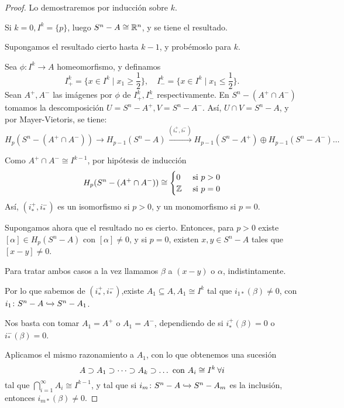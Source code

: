 \begin{proof}
  Lo demostraremos por inducción sobre $k$.

  Si $k = 0, I^k = \{p\}$, luego $S^n - A \cong \mathbb{R}^n$, y se tiene el resultado.

  Supongamos el resultado cierto hasta $k-1$, y probémoslo para $k$.

  Sea $\phi \colon I^k \to A$ homeomorfismo, y definamos
  \[ I_+^k = \{x \in I^k \mid x_1 \geq \frac{1}{2}\}, \quad I_-^k = \{x \in I^k \mid x_1 \leq \frac{1}{2}\}.\]
  Sean $A^+, A^-$ las imágenes por $\phi$ de $I_+^k, I_-^k$ respectivamente.
  En $S^n - (A^+ \cap A^-)$ tomamos la descomposición $U = S^n - A^+, V = S^n - A^-$. Así,
  $U \cap V = S^n - A$, y por Mayer-Vietoris, se tiene:
  \[ H_p(S^n - (A^+ \cap A^-)) \to H_{p-1}(S^n - A) \xrightarrow{(i_*^+, i_*^-)} H_{p-1}(S^n - A^+) \oplus H_{p-1}(S^n - A^-) \dots \]

  Como $A^+ \cap A^- \cong I^{k-1}$, por hipótesis de inducción \\
  \[H_p(S^n - (A^+ \cap A^-)) \cong \begin{cases} 0 &\text{ si } p > 0 \\
                                                \mathbb{Z} &\text{ si } p = 0 \end{cases}\]
  Así, $(i_*^+, i_*^-)$ es un isomorfismo si $p > 0$, y un monomorfismo si $p = 0$.

  Supongamos ahora que el resultado no es cierto. Entonces, para $p > 0$ existe $[\alpha] \in H_p(S^n - A)$ con $[\alpha] \neq 0$, y
  si $p = 0$, existen $x, y \in S^n - A$ tales que $[x-y] \neq 0$.

  Para tratar ambos casos a la vez llamamos $\beta$ a $(x-y)$ o $\alpha$, indistintamente.

  Por lo que sabemos de $(i_*^+, i_*^-)$,existe $A_1 \subseteq A, A_1 \cong I^k$ tal que
  $i_{1*}(\beta) \neq 0$, con $i_1 \colon S^n - A \xhookrightarrow{} S^n - A_1$.

  Nos basta con tomar $A_1 = A^+$ o $A_1 = A^-$, dependiendo de si $i_*^+(\beta) = 0$ o $i_*^-(\beta) = 0$.

  Aplicamos el mismo razonamiento a $A_1$, con lo que obtenemos una sucesión
  \[ A \supset A_1 \supset \dots \supset A_k \supset \dots \text{ con } A_i \cong I^k \hspace{0.2em} \forall i \]
  tal que $\bigcap\limits_{i = 1}^\infty A_i \cong I^{k-1}$, y tal que si $i_m \colon S^n - A \xhookrightarrow{} S^n - A_m$
  es la inclusión, entonces $i_{m*}(\beta) \neq 0$.


\end{proof}
